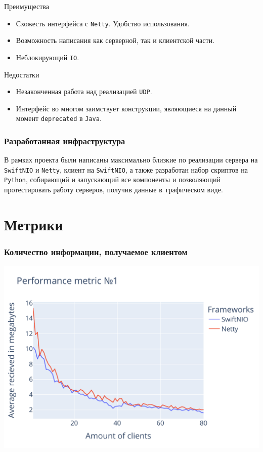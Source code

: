 \documentclass[10pt,xcolor={table,dvipsnames},t]{beamer}
\begin{document}
\smallframetitle

\begin{frame}{Преимущества}

\begin{itemize}
\item Схожесть интерфейса с \texttt{Netty}. Удобство использования. 
\item Возможность написания как серверной, так и клиентской части. 
\item Неблокирующий \texttt{IO}. 
\end{itemize}

\end{frame}

\begin{frame}{Недостатки}

\begin{itemize}
\item Незаконченная работа над реализацией \texttt{UDP}.
\item Интерфейс во многом заимствует конструкции, являющиеся на данный момент \texttt{deprecated} в \texttt{Java}. 
\end{itemize}

\end{frame}

\begin{frame}
\frametitle{Разработанная инфраструктура}

В рамках проекта были написаны максимально близкие по реализации сервера на \texttt{SwiftNIO} и \texttt{Netty}, клиент на \texttt{SwiftNIO}, а также разработан набор скриптов на \texttt{Python}, собирающий и запускающий все компоненты и позволяющий протестировать работу серверов, получив данные в~графическом виде.

\end{frame}

\section{Метрики}

\begin{frame}
\frametitle{Количество информации, получаемое клиентом}

\begin{center}
    \includegraphics[width=.65\textwidth,height=.65\textheight]{metric1_final.pdf}
\end{center}
\end{frame}
\end{document}
